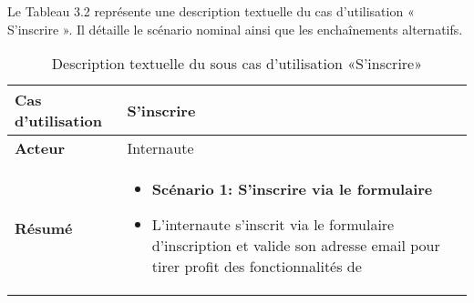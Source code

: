 Le Tableau 3.2 représente une description textuelle du cas d'utilisation « S'inscrire ». Il détaille le scénario nominal ainsi que les enchaînements alternatifs.
\begin{longtable}{|>{\arraybackslash}p{4.2cm}|>{\arraybackslash}p{12.5cm}|}
\caption{\centering Description textuelle du sous cas d'utilisation «S'inscrire»}
\label{tab:backlog:ch2:inscription} \\
\hline
\rowcolor{gray!30}
\textbf{Cas d'utilisation} & S'inscrire \\
\hline
\textbf{Acteur} & Internaute \\
\hline
\textbf{Résumé} &
\begin{itemize}[label=]
    \item \textbf{Scénario 1: S'inscrire via le formulaire}
    \item L'internaute s'inscrit via le formulaire d'inscription et valide son adresse email pour tirer profit des fonctionnalités de


\end{itemize}
\end{longtable}
